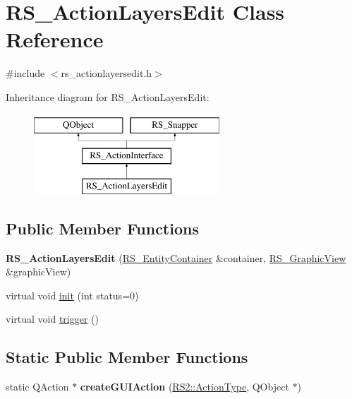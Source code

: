 \hypertarget{classRS__ActionLayersEdit}{\section{R\-S\-\_\-\-Action\-Layers\-Edit Class Reference}
\label{classRS__ActionLayersEdit}
}


{\ttfamily \#include $<$rs\-\_\-actionlayersedit.\-h$>$}

Inheritance diagram for R\-S\-\_\-\-Action\-Layers\-Edit\-:\begin{figure}[H]
\begin{center}
\leavevmode
\includegraphics[height=3.000000cm]{classRS__ActionLayersEdit}
\end{center}
\end{figure}
\subsection*{Public Member Functions}
\begin{DoxyCompactItemize}
\item 
\hypertarget{classRS__ActionLayersEdit_a60b273ade3eb4be214492b73727e124f}{{\bfseries R\-S\-\_\-\-Action\-Layers\-Edit} (\hyperlink{classRS__EntityContainer}{R\-S\-\_\-\-Entity\-Container} \&container, \hyperlink{classRS__GraphicView}{R\-S\-\_\-\-Graphic\-View} \&graphic\-View)}\label{classRS__ActionLayersEdit_a60b273ade3eb4be214492b73727e124f}

\item 
virtual void \hyperlink{classRS__ActionLayersEdit_aad8416815f3b031348e23c9c5e869c17}{init} (int status=0)
\item 
virtual void \hyperlink{classRS__ActionLayersEdit_a13b6631ab70ec44c8c6ab5af9a3c81b9}{trigger} ()
\end{DoxyCompactItemize}
\subsection*{Static Public Member Functions}
\begin{DoxyCompactItemize}
\item 
\hypertarget{classRS__ActionLayersEdit_a2273fe9aee77d9f63f32bb2465ad79a9}{static Q\-Action $\ast$ {\bfseries create\-G\-U\-I\-Action} (\hyperlink{classRS2_afe3523e0bc41fd637b892321cfc4b9d7}{R\-S2\-::\-Action\-Type}, Q\-Object $\ast$)}\label{classRS__ActionLayersEdit_a2273fe9aee77d9f63f32bb2465ad79a9}

\end{DoxyCompactItemize}
